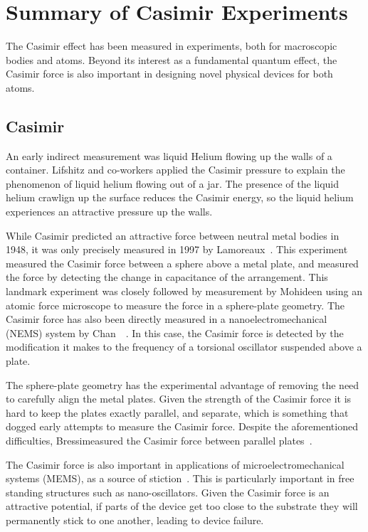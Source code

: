 \section{Summary of Casimir Experiments}

The Casimir effect has been measured in experiments, both for macroscopic bodies and atoms.
Beyond its interest as a fundamental quantum effect, the Casimir force is also important 
in designing novel physical devices for both atoms.

\subsection{Casimir}
An early indirect measurement was liquid Helium flowing up the walls of a container.  
Lifshitz and co-workers applied the Casimir pressure to explain the phenomenon of liquid helium
flowing out of a jar.  The presence of the liquid helium crawlign up the surface reduces the Casimir energy,
so the liquid helium experiences an attractive pressure up the walls.  

While Casimir predicted an attractive force between neutral metal bodies in 1948,
it was only precisely measured in 1997 by Lamoreaux~\cite{Lamoreaux1997}.   
This experiment measured the Casimir force between a sphere above a metal plate,
and measured the force by detecting the change in capacitance of the arrangement.  
This landmark experiment was closely followed by measurement by Mohideen\etal\cite{Mohideen1998}
using an atomic force microscope to measure the force in a sphere-plate geometry.  
The Casimir force has also been directly measured in a nanoelectromechanical (NEMS) system 
by Chan~\etal~\cite{Chan2001}.  In this case, the Casimir force is detected by the modification it
makes to the frequency of a torsional oscillator suspended above a plate.  

The sphere-plate geometry has the experimental advantage of removing the need to carefully
align the metal plates. Given the strength of the Casimir force it is hard to keep the plates exactly parallel,
and separate, which is something that dogged early attempts to measure the Casimir force.
Despite the aforementioned difficulties, Bressi\etal measured the Casimir force between parallel plates~\cite{Bressi2002}.  

The Casimir force is also important in applications of microelectromechanical systems (MEMS), 
as a source of stiction~\cite{Tas1996, Serry1998, Buks2001}.  This is particularly important
in free standing structures such as nano-oscillators.  
Given the Casimir force is an attractive potential, if parts of the device get too close to the substrate
they will permanently stick to one another, leading to device failure.  

